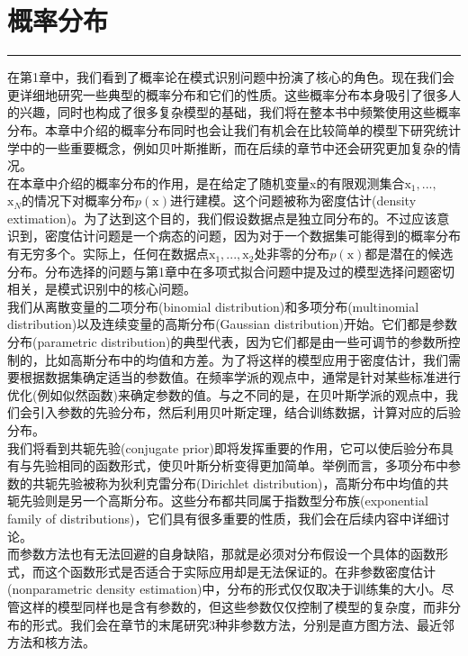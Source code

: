 \documentclass[b5paper]{book}
\renewcommand {\thetable} {\thechapter{}.\arabic{table}}
\renewcommand {\thefigure} {\thechapter{}.\arabic{figure}}
\numberwithin{equation}{chapter}
\newcommand {\bx} {\boldsymbol{\mathrm{x}}}
\begin{document}
	\chapter{概率分布}
	\noindent\rule[0.25\baselineskip]{\textwidth}{1pt}
	\renewcommand {\thetable} {\thechapter{}.\arabic{table}}
	\renewcommand {\thefigure} {\thechapter{}.\arabic{figure}}
	\textnormal{
	\indent 在第1章中，我们看到了概率论在模式识别问题中扮演了核心的角色。现在我们会更详细地研究一些典型的概率分布和它们的性质。这些概率分布本身吸引了很多人的兴趣，同时也构成了很多复杂模型的基础，我们将在整本书中频繁使用这些概率分布。本章中介绍的概率分布同时也会让我们有机会在比较简单的模型下研究统计学中的一些重要概念，例如贝叶斯推断，而在后续的章节中还会研究更加复杂的情况。\\
	\indent 在本章中介绍的概率分布的作用，是在给定了随机变量$\bx$的有限观测集合$\bx_1,...,$\\$\bx_N$的情况下对概率分布$p(\bx)$进行建模。这个问题被称为密度估计(density extimation)。为了达到这个目的，我们假设数据点是独立同分布的。不过应该意识到，密度估计问题是一个病态的问题，因为对于一个数据集可能得到的概率分布有无穷多个。实际上，任何在数据点$\bx_1,...,\bx_2$处非零的分布$p(\bx)$都是潜在的候选分布。分布选择的问题与第1章中在多项式拟合问题中提及过的模型选择问题密切相关，是模式识别中的核心问题。\\
	\indent 我们从离散变量的二项分布(binomial distribution)和多项分布(multinomial distribution)以及连续变量的高斯分布(Gaussian distribution)开始。它们都是参数分布(parametric distribution)的典型代表，因为它们都是由一些可调节的参数所控制的，比如高斯分布中的均值和方差。为了将这样的模型应用于密度估计，我们需要根据数据集确定适当的参数值。在频率学派的观点中，通常是针对某些标准进行优化(例如似然函数)来确定参数的值。与之不同的是，在贝叶斯学派的观点中，我们会引入参数的先验分布，然后利用贝叶斯定理，结合训练数据，计算对应的后验分布。\\
	\indent 我们将看到共轭先验(conjugate prior)即将发挥重要的作用，它可以使后验分布具有与先验相同的函数形式，使贝叶斯分析变得更加简单。举例而言，多项分布中参数的共轭先验被称为狄利克雷分布(Dirichlet distribution)，高斯分布中均值的共轭先验则是另一个高斯分布。这些分布都共同属于指数型分布族(exponential family of distributions)，它们具有很多重要的性质，我们会在后续内容中详细讨论。\\
	\indent 而参数方法也有无法回避的自身缺陷，那就是必须对分布假设一个具体的函数形式，而这个函数形式是否适合于实际应用却是无法保证的。在非参数密度估计(nonparametric density estimation)中，分布的形式仅仅取决于训练集的大小。尽管这样的模型同样也是含有参数的，但这些参数仅仅控制了模型的复杂度，而非分布的形式。我们会在章节的末尾研究3种非参数方法，分别是直方图方法、最近邻方法和核方法。
	}
\end{document}
